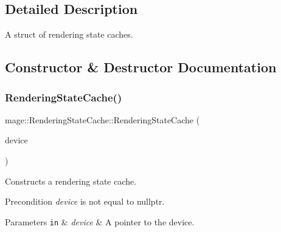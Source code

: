 \subsection{Detailed Description}
A struct of rendering state caches. 

\subsection{Constructor \& Destructor Documentation}
\hypertarget{structmage_1_1_rendering_state_cache_ad818eaa6c950c5851d6e684b9a4b3a65}{}\label{structmage_1_1_rendering_state_cache_ad818eaa6c950c5851d6e684b9a4b3a65} 
\subsubsection{\texorpdfstring{Rendering\+State\+Cache()}{RenderingStateCache()}\hspace{0.1cm}{\footnotesize\ttfamily [1/3]}}
{\footnotesize\ttfamily mage\+::\+Rendering\+State\+Cache\+::\+Rendering\+State\+Cache (\begin{DoxyParamCaption}\item[{I\+D3\+D11\+Device2 $\ast$}]{device }\end{DoxyParamCaption})\hspace{0.3cm}{\ttfamily [explicit]}}

Constructs a rendering state cache.

\begin{DoxyPrecond}{Precondition}
{\itshape device} is not equal to {\ttfamily nullptr}. 
\end{DoxyPrecond}

\begin{DoxyParams}[1]{Parameters}
\mbox{\tt in}  & {\em device} & A pointer to the device. \\
\hline
\end{DoxyParams}
\hypertarget{structmage_1_1_rendering_state_cache_a47c0f5527ce10ca9b6a059946efda239}{}\label{structmage_1_1_rendering_state_cache_a47c0f5527ce10ca9b6a059946efda239} 

